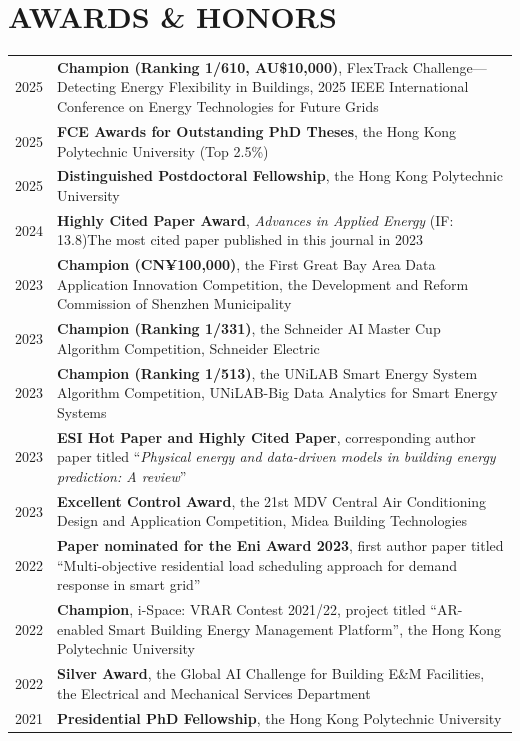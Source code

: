 \documentclass[11pt,a4paper]{article}
\newcounter{cvbookmark}
\newcommand{\cvoutline}[2]{%
  \stepcounter{cvbookmark}%
  \pdfbookmark[#1]{#2}{cvbookmark.\thecvbookmark}%
}
\newcommand{\cvsection}[2]{%
  \cvoutline{1}{#1}%
  \section*{#2}%
}
\begin{document}
\cvsection{AWARDS \& HONORS}{AWARDS \& HONORS}
\begin{longtable}{@{}p{0.75cm} >{\justifying\arraybackslash}p{\dimexpr\textwidth-0.95cm\relax}@{}}
2025 & \textbf{Champion (Ranking 1/610, AU\$10,000)}, FlexTrack Challenge---Detecting Energy Flexibility in Buildings, 2025 IEEE International Conference on Energy Technologies for Future Grids \\
2025 & \textbf{FCE Awards for Outstanding PhD Theses}, the Hong Kong Polytechnic University (Top 2.5\%) \\
2025 & \textbf{Distinguished Postdoctoral Fellowship}, the Hong Kong Polytechnic University \\
2024 & \textbf{Highly Cited Paper Award}, \textit{Advances in Applied Energy} (IF: 13.8)\newline The most cited paper published in this journal in 2023 \\
2023 & \textbf{Champion (CN¥100,000)}, the First Great Bay Area Data Application Innovation Competition, the Development and Reform Commission of Shenzhen Municipality \\
2023 & \textbf{Champion (Ranking 1/331)}, the Schneider AI Master Cup Algorithm Competition, Schneider Electric \\
2023 & \textbf{Champion (Ranking 1/513)}, the UNiLAB Smart Energy System Algorithm Competition, UNiLAB-Big Data Analytics for Smart Energy Systems \\
2023 & \textbf{ESI Hot Paper and Highly Cited Paper}, corresponding author paper titled ``\textit{Physical energy and data-driven models in building energy prediction: A review}'' \\
2023 & \textbf{Excellent Control Award}, the 21st MDV Central Air Conditioning Design and Application Competition, Midea Building Technologies \\
2022 & \textbf{Paper nominated for the Eni Award 2023}, first author paper titled ``Multi-objective residential load scheduling approach for demand response in smart grid'' \\
2022 & \textbf{Champion}, i-Space: VRAR Contest 2021/22, project titled ``AR-enabled Smart Building Energy Management Platform'', the Hong Kong Polytechnic University \\
2022 & \textbf{Silver Award}, the Global AI Challenge for Building E\&M Facilities, the Electrical and Mechanical Services Department \\
2021 & \textbf{Presidential PhD Fellowship}, the Hong Kong Polytechnic University \\
\end{longtable}
\end{document}
